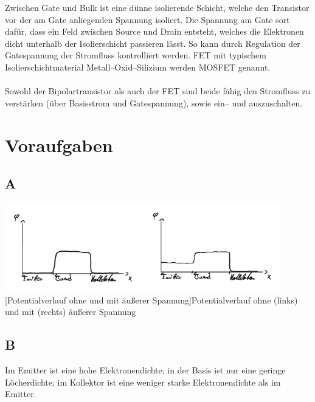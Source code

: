 \documentclass[10pt]{article}
\newenvironment{Figure}
  {\par\medskip\noindent\minipage{\linewidth}}
  {\endminipage\par\medskip}
\begin{document}
\begin{multicols}{2}
\begin{Figure}
	\end{Figure}
	Zwischen Gate und Bulk ist eine dünne isolierende Schicht, welche den Transistor vor der am Gate anliegenden Spannung isoliert.
	Die Spannung am Gate sort dafür, dass ein Feld zwischen Source und Drain entsteht, welches die Elektronen dicht unterhalb der Isolierschicht passieren lässt.
	So kann durch Regulation der Gatespannung der Stromfluss kontrolliert werden.
	FET mit typischem Isolierschichtmaterial Metall--Oxid--Silizium werden MOSFET genannt.
	\\\\ Sowohl der Bipolartransistor als auch der FET sind beide fähig den Stromfluss zu verstärken (über Basisstrom und Gatespannung), sowie ein-- und auszuschalten.

	\section{Voraufgaben}
	\subsection{A}
	\begin{Figure}
		\centering
		\includegraphics[width=0.9\textwidth]{A_crop.pdf}
		[Potentialverlauf ohne und mit äußerer Spannung]{Potentialverlauf ohne (links) und mit (rechts) äußerer Spannung}
	\end{Figure}

	\subsection{B}
	Im Emitter ist eine hohe Elektronendichte; in der Basis ist nur eine geringe Löcherdichte; im Kollektor ist eine weniger starke Elektronendichte als im Emitter.


\end{multicols}
\end{document}
